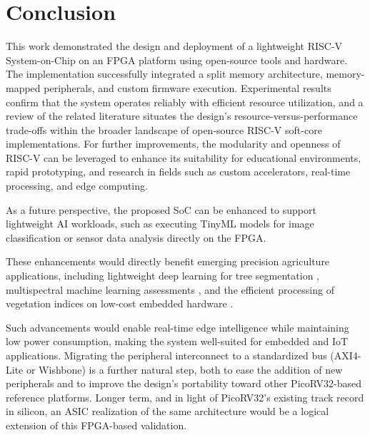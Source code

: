 \documentclass[runningheads]{llncs}
\begin{document}
\section{Conclusion}\label{sec7}
This work demonstrated the design and deployment of a lightweight RISC-V System-on-Chip on an FPGA platform using open-source tools and hardware. The implementation successfully integrated a split memory architecture, memory-mapped peripherals, and custom firmware execution. Experimental results confirm that the system operates reliably with efficient resource utilization, and a review of the related literature situates the design's resource-versus-performance trade-offs within the broader landscape of open-source RISC-V soft-core implementations. For further improvements, the modularity and openness of RISC-V can be leveraged to enhance its suitability for educational environments, rapid prototyping, and research in fields such as custom accelerators, real-time processing, and edge computing.

As a future perspective, the proposed SoC can be enhanced to support lightweight AI workloads, such as executing TinyML models for image classification or sensor data analysis directly on the FPGA. 


These enhancements would directly benefit emerging precision agriculture applications, including lightweight deep learning for tree segmentation \cite{saddik_uav}, multispectral machine learning assessments \cite{saddik_assessing}, and the efficient processing of vegetation indices on low-cost embedded hardware \cite{saddik_sus}.






Such advancements would enable real-time edge intelligence while maintaining low power consumption, making the system well-suited for embedded and IoT applications. Migrating the peripheral interconnect to a standardized bus (AXI4-Lite or Wishbone) is a further natural step, both to ease the addition of new peripherals and to improve the design's portability toward other PicoRV32-based reference platforms. Longer term, and in light of PicoRV32's existing track record in silicon, an ASIC realization of the same architecture would be a logical extension of this FPGA-based validation.




\end{document}
